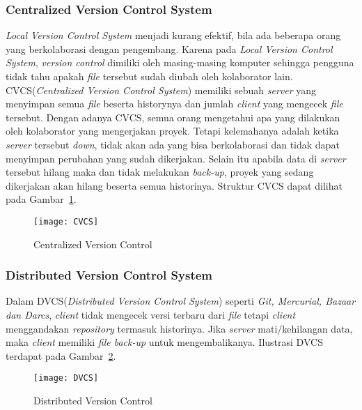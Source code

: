 \subsubsection{Centralized Version Control System}
\textit{Local Version Control System} menjadi kurang efektif, bila ada beberapa orang yang berkolaborasi dengan pengembang. Karena pada \textit{Local Version Control System}, \textit{version control} dimiliki oleh masing-masing komputer sehingga pengguna tidak tahu apakah \textit{file} tersebut sudah diubah oleh kolaborator lain. CVCS(\textit{Centralized Version Control System}) memiliki sebuah \textit{server} yang menyimpan semua \textit{file} beserta historynya dan jumlah \textit{client} yang mengecek \textit{file} tersebut. Dengan adanya CVCS, semua orang mengetahui apa yang dilakukan oleh kolaborator yang mengerjakan proyek. Tetapi kelemahanya adalah ketika \textit{server} tersebut \textit{down}, tidak akan ada yang bisa berkolaborasi dan tidak dapat menyimpan perubahan yang sudah dikerjakan. Selain itu apabila data di \textit{server} tersebut hilang maka dan tidak melakukan \textit{back-up}, proyek yang sedang dikerjakan akan hilang beserta semua historinya. Struktur CVCS dapat dilihat pada Gambar~\ref{fig:CVCS}.

\begin{figure}[H]
	\centering  
	\texttt{[image: CVCS]}  
	\caption[Centralized Version Control]{Centralized Version Control}
	\label{fig:CVCS} 
\end{figure}

\subsubsection{Distributed Version Control System}
Dalam DVCS(\textit{Distributed Version Control System}) seperti \textit{Git, Mercurial, Bazaar dan Darcs}, \textit{client} tidak mengecek versi terbaru dari \textit{file} tetapi \textit{client} menggandakan \textit{repository} termasuk historinya. Jika \textit{server} mati/kehilangan data, maka \textit{client} memiliki \textit{file back-up} untuk mengembalikanya.  Ilustrasi DVCS terdapat pada Gambar~\ref{fig:DVCS}.

\begin{figure}[H]
	\centering  
	\texttt{[image: DVCS]}  
	\caption[Distributed Version Control]{Distributed Version Control}
	\label{fig:DVCS} 
\end{figure}

